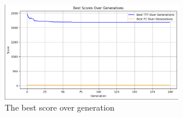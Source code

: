 \begin{figure}[h]
    \centering
    \includegraphics[width=0.7\textwidth]{figures/Best_score.PNG}
    \caption{The best score over generation}
    \label{fig:Best Score Over Generation} 
\end{figure}


